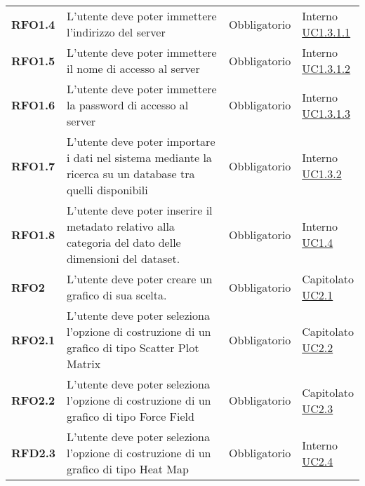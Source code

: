 \begin{longtable}[H]{>{\raggedright\bfseries}m{20mm} >{\raggedright}m{90mm} >{\raggedright}m{28mm} >{\raggedright\arraybackslash}m{30mm}}
    RFO1.4
    &   L'utente deve poter immettere l'indirizzo del server
    & Obbligatorio
    & \makecell{ Interno \\  \hyperref[spar:uc1.3.1.1]{UC1.3.1.1}}\\

    RFO1.5
    &   L'utente deve poter immettere il nome di accesso al server
    & Obbligatorio
    & \makecell{ Interno \\  \hyperref[spar:uc1.3.1.2]{UC1.3.1.2}}\\

    RFO1.6
    &   L'utente deve poter immettere la password di accesso al server
    & Obbligatorio
    & \makecell{ Interno \\  \hyperref[spar:uc1.3.1.3]{UC1.3.1.3}}\\

    RFO1.7
    &   L'utente deve poter importare i dati nel sistema mediante la ricerca
        su un database tra quelli disponibili
    & Obbligatorio
    & \makecell{ Interno \\ \hyperref[par:uc1.3.2]{UC1.3.2}}\\

    RFO1.8
    &   L'utente deve poter inserire il metadato relativo alla categoria
        del dato delle dimensioni del dataset.
    & Obbligatorio
    & \makecell{ Interno \\ \hyperref[ssub:uc1.4]{UC1.4}}\\

    RFO2
    & L'utente deve poter creare un grafico di sua scelta.
    & Obbligatorio
    & \makecell{ Capitolato \\ \hyperref[ssub:uc2.1]{UC2.1}}\\

    RFO2.1
    & L'utente deve poter seleziona l'opzione di costruzione di un grafico di tipo Scatter Plot
    Matrix
    & Obbligatorio
    & \makecell{ Capitolato \\   \hyperref[ssub:uc2.2]{UC2.2}}\\

    RFO2.2
    & L'utente deve poter seleziona l'opzione di costruzione di un grafico di tipo Force Field
    & Obbligatorio
    & \makecell{ Capitolato \\  \hyperref[ssub:uc2.3]{UC2.3}}\\

    RFD2.3
    & L'utente deve poter seleziona l'opzione di costruzione di un grafico di tipo Heat Map
    & Obbligatorio
    & \makecell{ Interno \\  \hyperref[ssub:uc2.4]{UC2.4}}\\


\end{longtable}
